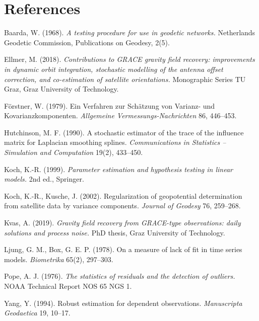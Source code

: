 \chapter*{References}

\begin{description}[leftmargin=0pt,labelindent=0pt,itemsep=3pt]
\item Baarda, W. (1968). \emph{A testing procedure for use in geodetic networks.} Netherlands
  Geodetic Commission, Publications on Geodesy, 2(5).
\item Ellmer, M. (2018). \emph{Contributions to GRACE gravity field recovery: improvements in
  dynamic orbit integration, stochastic modelling of the antenna offset correction, and
  co-estimation of satellite orientations.} Monographic Series TU Graz, Graz University of
  Technology.
\item Förstner, W. (1979). Ein Verfahren zur Schätzung von Varianz- und Kovarianzkomponenten.
  \emph{Allgemeine Vermessungs-Nachrichten} 86, 446--453.
\item Hutchinson, M. F. (1990). A stochastic estimator of the trace of the influence matrix for
  Laplacian smoothing splines. \emph{Communications in Statistics -- Simulation and Computation}
  19(2), 433--450.
\item Koch, K.-R. (1999). \emph{Parameter estimation and hypothesis testing in linear models.}
  2nd ed., Springer.
\item Koch, K.-R., Kusche, J. (2002). Regularization of geopotential determination from satellite
  data by variance components. \emph{Journal of Geodesy} 76, 259--268.
\item Kvas, A. (2019). \emph{Gravity field recovery from GRACE-type observations: daily solutions
  and process noise.} PhD thesis, Graz University of Technology.
\item Ljung, G. M., Box, G. E. P. (1978). On a measure of lack of fit in time series models.
  \emph{Biometrika} 65(2), 297--303.
\item Pope, A. J. (1976). \emph{The statistics of residuals and the detection of outliers.} NOAA
  Technical Report NOS 65 NGS 1.
\item Yang, Y. (1994). Robust estimation for dependent observations. \emph{Manuscripta Geodaetica}
  19, 10--17.
\end{description}
